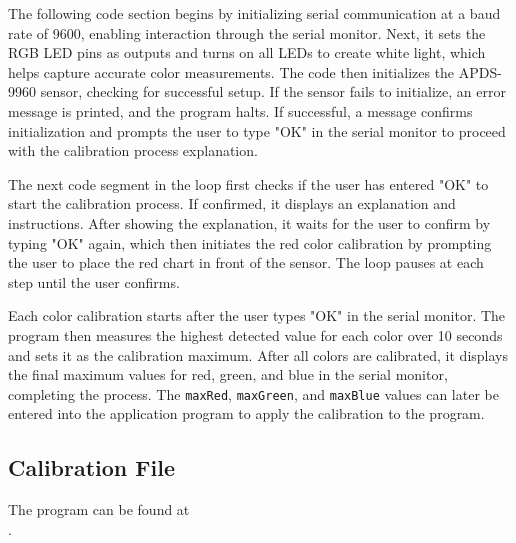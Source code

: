 

The following code section begins by initializing serial communication at a baud rate of 9600, enabling interaction through the serial monitor. Next, it sets the RGB LED pins as outputs and turns on all LEDs to create white light, which helps capture accurate color measurements. The code then initializes the APDS-9960 sensor, checking for successful setup. If the sensor fails to initialize, an error message is printed, and the program halts. If successful, a message confirms initialization and prompts the user to type "OK" in the serial monitor to proceed with the calibration process explanation.



The next code segment in the loop first checks if the user has entered "OK" to start the calibration process. If confirmed, it displays an explanation and instructions. After showing the explanation, it waits for the user to confirm by typing "OK" again, which then initiates the red color calibration by prompting the user to place the red chart in front of the sensor. The loop pauses at each step until the user confirms.



Each color calibration starts after the user types "OK" in the serial monitor. The program then measures the highest detected value for each color over 10 seconds and sets it as the calibration maximum. After all colors are calibrated, it displays the final maximum values for red, green, and blue in the serial monitor, completing the process. The \texttt{maxRed}, \texttt{maxGreen}, and \texttt{maxBlue} values can later be entered into the application program to apply the calibration to the program.



\subsection{Calibration File}

The program can be found at \\
.

